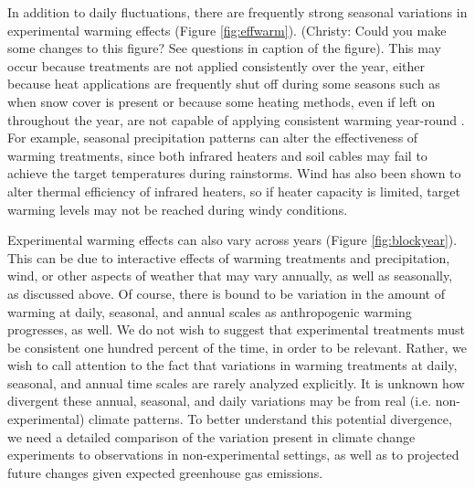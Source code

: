 \documentclass{article}
\begin{document}
\par In addition to daily fluctuations, there are frequently strong seasonal variations in experimental warming effects (Figure \ref{fig:effwarm}). (Christy: Could you make some changes to this figure? See questions in caption of the figure). This may occur because treatments are not applied consistently over the year, either because heat applications are frequently shut off during some seasons such as when snow cover is present or because some heating methods, even if left on throughout the year, are not capable of applying consistent warming year-round \citep[e.g.][]{clark2014a,clark2014b,hagedorn2010}. For example, seasonal precipitation patterns can alter the effectiveness of warming treatments, since both infrared heaters and soil cables may fail to achieve the target temperatures during  rainstorms\citep{peterjohn1993,hoeppner2012}. Wind has also been shown to alter thermal efficiency of infrared heaters, so if heater capacity is limited, target warming levels may not be reached during windy conditions\citep{kimball2005,kimball2008}.

\par Experimental warming effects can also vary across years  (Figure \ref{fig:blockyear}). This  can be due  to interactive effects of warming  treatments and  precipitation, wind, or other aspects of weather  that may  vary  annually, as well as seasonally, as discussed above. Of course, there is bound to be variation in the amount of warming at daily, seasonal, and annual scales as anthropogenic warming progresses, as well. We do not wish to suggest that experimental treatments must be consistent one hundred percent of the time, in order to be relevant. Rather, we wish to call attention to the fact that variations in warming treatments at daily, seasonal, and annual time scales are rarely analyzed explicitly.  It is unknown how divergent these annual, seasonal, and daily variations may be from real (i.e. non-experimental) climate patterns. To better understand this potential divergence, we need a detailed comparison of the variation present in climate change experiments to observations in non-experimental settings, as well as to projected future changes given expected greenhouse gas emissions.  
\end{document}
